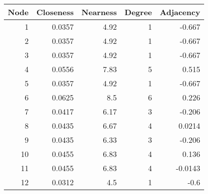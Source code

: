 \begin{center}
\begin{tabular}{rrrrr}
\hline
   Node &   Closeness &   Nearness &   Degree &   Adjacency \\
\hline
      1 &      0.0357 &       4.92 &        1 &     -0.667  \\
      2 &      0.0357 &       4.92 &        1 &     -0.667  \\
      3 &      0.0357 &       4.92 &        1 &     -0.667  \\
      4 &      0.0556 &       7.83 &        5 &      0.515  \\
      5 &      0.0357 &       4.92 &        1 &     -0.667  \\
      6 &      0.0625 &       8.5  &        6 &      0.226  \\
      7 &      0.0417 &       6.17 &        3 &     -0.206  \\
      8 &      0.0435 &       6.67 &        4 &      0.0214 \\
      9 &      0.0435 &       6.33 &        3 &     -0.206  \\
     10 &      0.0455 &       6.83 &        4 &      0.136  \\
     11 &      0.0455 &       6.83 &        4 &     -0.0143 \\
     12 &      0.0312 &       4.5  &        1 &     -0.6    \\
\hline
\end{tabular}
\end{center}